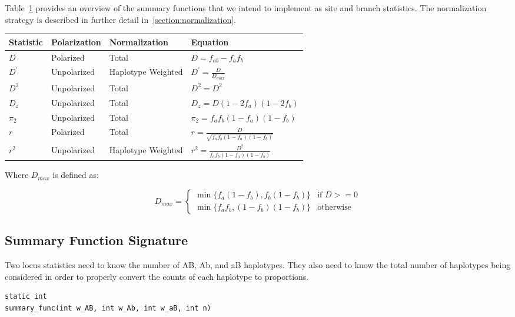 \documentclass[12pt]{article}
\begin{document}
Table~\ref{table:summary_functions} provides an overview of the summary
functions that we intend to implement as site and branch statistics. The
normalization strategy is described in further detail in~\ref{section:normalization}.

\begin{table}[H]
  \begin{tabular}{llll} Statistic & Polarization & Normalization & Equation\\

    \hline $D$ & Polarized & Total & $D = f_{ab} - f_{a}f_{b}$ \\

    $D^{\prime}$ & Unpolarized & Haplotype Weighted & $D^{\prime} =
\frac{D}{D_{max}}$ \\

    $D^{2}$ & Unpolarized & Total & $D^{2} = D^{2}$ \\

    $D_{z}$ & Unpolarized & Total & $D_{z} = D (1 - 2 f_{a})(1-2f_{b})$ \\

    $\pi_{2}$ & Unpolarized & Total & $\pi_{2} = f_{a}f_{b}(1-f_{a})(1-f_{b})$
\\

    $r$ & Polarized & Total & $r =
\frac{D}{\sqrt{f_{a}f_{b}(1-f_{a})(1-f_{b})}}$ \\

    $r^{2}$ & Unpolarized & Haplotype Weighted & $r^{2} =
\frac{D^{2}}{f_{a}f_{b}(1-f_{a})(1-f_{b})}$ \\
  \end{tabular}
\label{table:summary_functions}
\end{table}
Where $D_{max}$ is defined as:

\[
  D_{max} = 
  \begin{cases}
    \min\{f_{a}(1-f_{b}),f_{b}(1-f_{b})\} & \text{if~}D>=0 \\
    \min\{f_{a}f_{b},(1-f_{b})(1-f_{b})\} & \text{otherwise}
  \end{cases}
\]

\subsection{Summary Function Signature}
Two locus statistics need to know the number of AB, Ab, and aB haplotypes. They
also need to know the total number of haplotypes being considered in order to
properly convert the counts of each haplotype to proportions.
\begin{verbatim}
static int
summary_func(int w_AB, int w_Ab, int w_aB, int n)
\end{verbatim}
\end{document}
